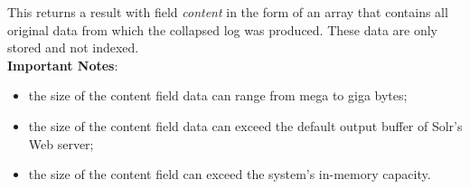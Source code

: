 \documentclass[twoside,11pt]{article}
\begin{document}
This returns a result with field \emph{content} in the form of an array that contains all original data from which the collapsed log was produced. These data are only stored and not indexed.\\

{\bf Important Notes}:
\begin{itemize}
\item the size of the content field data can range from mega to giga bytes;
\item the size of the content field data can exceed the default output buffer of Solr's Web server;
\item the size of the content field can exceed the system's in-memory capacity.
\end{itemize}
\end{document}
